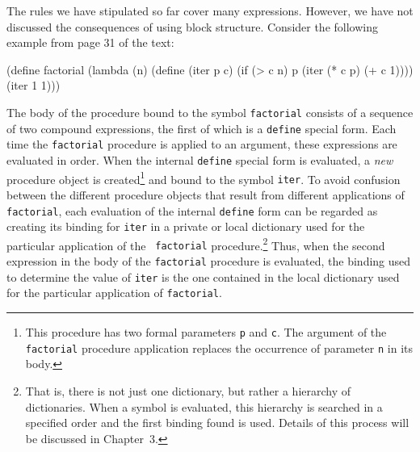 The rules we have stipulated so far cover many
expressions. However, we have not discussed the consequences of
using block structure. Consider the following example from page 31 of
the text:

\beginlisp
(define factorial
  (lambda (n)
     (define (iter p c)
       (if (> c n)
           p
           (iter (* c p) (+ c 1))))
     (iter 1 1)))
\endlisp

The body of the procedure bound to the symbol {\tt factorial} 
consists of a sequence of two compound expressions, the first of
which is a {\tt define} special form. Each time the {\tt factorial} 
procedure is applied to an argument, these expressions are evaluated 
in order. When the internal {\tt define} special form is evaluated, 
a {\it new} procedure object is created\footnote{This procedure has 
two formal parameters {\tt p} and {\tt c}. The argument of 
the {\tt factorial} procedure application replaces the occurrence 
of parameter {\tt n} in its body.} and bound to the symbol 
{\tt iter}. To avoid confusion between the different procedure objects that
result from different applications of {\tt factorial}, 
each evaluation of the internal {\tt define} form can be regarded 
as creating its binding for {\tt iter} in a private or
local dictionary used for the particular application of the {\tt
factorial} procedure.\footnote{That is, there is not just one dictionary, 
but rather a hierarchy of dictionaries. When a symbol is evaluated, this
hierarchy is searched in a specified order and the first binding
found is used. Details of this process will be discussed in Chapter~3.}
Thus, when the second expression in the body of the {\tt factorial} 
procedure is evaluated, the binding used to determine the value of
{\tt iter} is the one contained in the local dictionary used for the 
particular application of {\tt factorial}.




